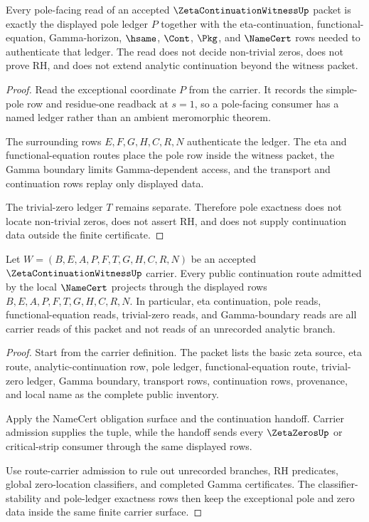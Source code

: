 \begin{theorem}
\label{thm:zeta-continuation-witness-pole-ledger-exactness}
Every pole-facing read of an accepted $\ZetaContinuationWitnessUp$ packet is exactly the displayed pole ledger $P$ together with the eta-continuation, functional-equation, Gamma-horizon, $\hsame$, $\Cont$, $\Pkg$, and $\NameCert$ rows needed to authenticate that ledger. The read does not decide non-trivial zeros, does not prove RH, and does not extend analytic continuation beyond the witness packet.
\end{theorem}
\begin{proof}
Read the exceptional coordinate $P$ from the carrier. It records the simple-pole row and residue-one readback at $s=1$, so a pole-facing consumer has a named ledger rather than an ambient meromorphic theorem.

The surrounding rows $E,F,G,H,C,R,N$ authenticate the ledger. The eta and functional-equation routes place the pole row inside the witness packet, the Gamma boundary limits Gamma-dependent access, and the transport and continuation rows replay only displayed data.

The trivial-zero ledger $T$ remains separate. Therefore pole exactness does not locate non-trivial zeros, does not assert RH, and does not supply continuation data outside the finite certificate.
\end{proof}

\begin{theorem}
\label{thm:zeta-continuation-witness-carrier-admission-tightening}
Let $W=(B,E,A,P,F,T,G,H,C,R,N)$ be an accepted $\ZetaContinuationWitnessUp$ carrier. Every public continuation route admitted by the local $\NameCert$ projects through the displayed rows $B,E,A,P,F,T,G,H,C,R,N$. In particular, eta continuation, pole reads, functional-equation reads, trivial-zero reads, and Gamma-boundary reads are all carrier reads of this packet and not reads of an unrecorded analytic branch.
\end{theorem}
\begin{proof}
Start from the carrier definition. The packet lists the basic zeta source, eta route, analytic-continuation row, pole ledger, functional-equation route, trivial-zero ledger, Gamma boundary, transport rows, continuation rows, provenance, and local name as the complete public inventory.

Apply the NameCert obligation surface and the continuation handoff. Carrier admission supplies the tuple, while the handoff sends every $\ZetaZerosUp$ or critical-strip consumer through the same displayed rows.

Use route-carrier admission to rule out unrecorded branches, RH predicates, global zero-location classifiers, and completed Gamma certificates. The classifier-stability and pole-ledger exactness rows then keep the exceptional pole and zero data inside the same finite carrier surface.
\end{proof}

